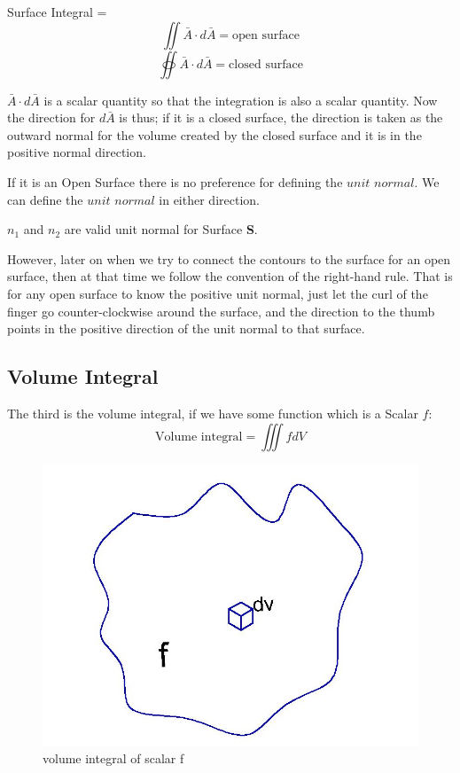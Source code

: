 Surface Integral =
\begin{equation*}
{   \iint \bar{A} \cdot d\bar{A}= \text{open surface} }
\end{equation*}
\begin{equation}
\oiint \bar{A} \cdot d\bar{A} = \text{closed surface}
\end{equation}

$\bar{A} \cdot d\bar{A}$ is a scalar quantity so that the integration is also a scalar quantity. Now the direction for $d\bar{A}$ is thus; if it is a closed surface, the direction is taken as the outward normal for the volume created by the closed surface and it is in the positive normal direction.

If it is an Open Surface there is no preference for defining the $unit$ $normal$. We can define the $unit$ $normal$ in either direction.

$n_1$ and $n_2$ are valid unit normal for Surface \textbf{S}.

However, later on when we try to connect the contours to the surface for an open surface, then at that time we follow the convention of the right-hand rule. That is for any open surface to know the positive unit normal, just let the curl of the finger go counter-clockwise around the surface, and the direction to the thumb points in the positive direction of the unit normal to that surface.

\subsection{Volume Integral}
The third is the volume integral, if we have some function which is a Scalar $f$:
\begin{dmath*}
\text{Volume integral} = \iiint fdV
\end{dmath*}

\begin{figure}
\centering
\includegraphics[width=0.7\linewidth]{graphics/fig175}
\caption{volume integral of scalar f}
\label{fig:page-8}
\end{figure}

